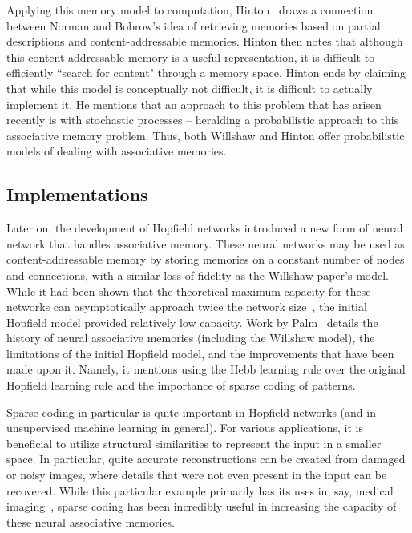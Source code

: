 \documentclass{sig-alternate}
\begin{document}
Applying this memory model to computation, Hinton~\cite{hinton} draws a connection between Norman and Bobrow's idea of 
retrieving memories based on partial descriptions and content-addressable memories.
Hinton then notes that although this content-addressable memory is a useful representation,  
it is difficult to efficiently ``search for content" through a memory space. 
Hinton ends by claiming that while this model is conceptually not difficult, it is difficult to actually 
implement it. He mentions that an approach to this problem that has arisen recently is with stochastic processes 
-- heralding a probabilistic approach to this associative memory problem. Thus, both Willshaw and Hinton offer probabilistic models
of dealing with associative memories.

\subsection{Implementations}
\label{subsec:implementations}
Later on, the development of Hopfield networks introduced a new form of neural network
that handles associative memory. These neural networks may be used as content-addressable memory by
storing memories on a constant number of nodes and connections, with a similar loss of 
fidelity as the Willshaw paper's model. While it had been shown that the theoretical maximum capacity for these networks
can asymptotically approach twice the network size~\cite{gardner}, the initial Hopfield model 
provided relatively low capacity. Work by Palm~\cite{palm} details the history of 
neural associative memories (including the Willshaw model), the limitations of the initial Hopfield model, and the improvements
that have been made upon it. Namely, it mentions using the Hebb learning rule over the original
Hopfield learning rule and the importance of sparse coding of patterns. 

Sparse coding in particular is quite important in Hopfield networks (and in unsupervised
machine learning in general). For various applications, it is beneficial to utilize
structural similarities to represent the input in a smaller space. In particular, quite 
accurate reconstructions can be created from damaged or noisy images, where details that were 
not even present in the input can be recovered. While this particular example primarily has its uses in, say, 
medical imaging~\cite{yang}, sparse coding has been incredibly useful in increasing the
capacity of these neural associative memories. 
\end{document}
